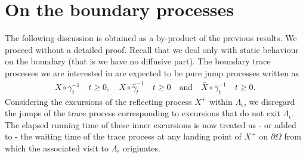 \documentclass[11pt,a4paper]{article}
\newcommand{\magenta}{black}
\begin{document}
\section{On the boundary processes}
\label{sec:BoundaryProcesses}
The following discussion is obtained as a by-product of the previous results. We proceed without a detailed proof. Recall that we deal only with static behaviour on the boundary (that is we have no diffusive part). The boundary trace processes we are interested in are expected to be pure jump processes written as
\begin{align*}
X \circ \gamma^{-1}_t \quad t \geq 0, \quad \hat{X} \circ \hat{\gamma}^{-1}_t \quad t\geq 0 \quad \textrm{and} \quad \bar{X} \circ \bar{\gamma}^{-1}_t \quad t\geq 0.
\end{align*}
{\color{\magenta}
Considering the excursions of the reflecting process $X^+$ within $\Lambda _{\epsilon}$, we disregard the jumps of the trace process corresponding to excursions that do not exit $\Lambda _{\epsilon}$. The elapsed running time of these inner excursions is now treated as - or added to - the waiting time of the trace process at any landing point of $X^+$ on $\partial \Omega$ from which the associated visit to $\Lambda_\epsilon$ originates.\\


}
\end{document}
